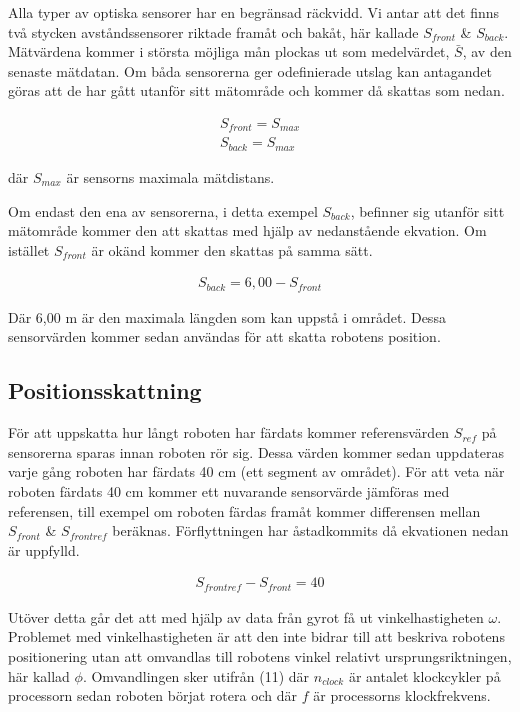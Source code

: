 \documentclass[a4paper,12pt,fleqn]{article}
\begin{document}
Alla typer av optiska sensorer har en begränsad räckvidd. Vi antar att det finns två stycken avståndssensorer riktade framåt och bakåt, här kallade $S_{front}$ \& $S_{back}$. Mätvärdena kommer i största möjliga mån plockas ut som medelvärdet, $\bar{S}$, av den senaste mätdatan. Om båda sensorerna ger odefinierade utslag kan antagandet göras att de har gått utanför sitt mätområde och kommer då skattas som nedan. 

\begin{gather}
	S_{front}=S_{max}\\
	S_{back}=S_{max}
\end{gather}

där $S_{max}$ är sensorns maximala mätdistans.

Om endast den ena av sensorerna, i detta exempel $S_{back}$, befinner sig utanför sitt mätområde kommer den att skattas med hjälp av nedanstående ekvation. Om istället $S_{front}$ är okänd kommer den skattas på samma sätt. 

\begin{gather}
	S_{back}=6,00-S_{front}
\end{gather}

Där 6,00 m är den maximala längden som kan uppstå i området. Dessa sensorvärden kommer sedan användas för att skatta robotens position.



\subsection{Positionsskattning}

För att uppskatta hur långt roboten har färdats kommer referensvärden $S_{ref}$ på sensorerna sparas innan roboten rör sig. Dessa värden kommer sedan uppdateras varje gång roboten har färdats 40 cm (ett segment av området). För att veta när roboten färdats 40 cm kommer ett nuvarande sensorvärde jämföras med referensen, till exempel om roboten färdas framåt kommer differensen mellan $S_{front}$ \& $S_{frontref}$ beräknas. Förflyttningen har åstadkommits då ekvationen nedan är uppfylld. 

\begin{gather}
	S_{frontref} - S_{front} = 40
\end{gather}

Utöver detta går det att med hjälp av data från gyrot få ut vinkelhastigheten $\omega$. Problemet med vinkelhastigheten är att den inte bidrar till att beskriva robotens positionering utan att omvandlas till robotens vinkel relativt ursprungsriktningen, här kallad $\phi$. Omvandlingen sker utifrån (11) där $n_{clock}$ är antalet klockcykler på processorn sedan roboten börjat rotera och där $f$ är processorns klockfrekvens.
\end{document}
